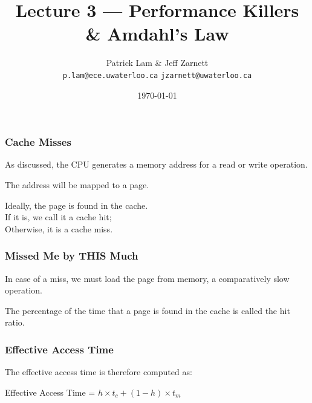 

\title{Lecture 3 --- Performance Killers \& Amdahl's Law }

\author{Patrick Lam \& Jeff Zarnett \\ \small \texttt{p.lam@ece.uwaterloo.ca} \texttt{jzarnett@uwaterloo.ca}}
\date{\today}




\begin{frame}
  \titlepage

 \end{frame}



\begin{frame}
\frametitle{Cache Misses}

As discussed, the CPU generates a memory address for a read or write operation.

The address will be mapped to a page. 

Ideally, the page is found in the cache.\\
\quad If it is, we call it a \alert{cache hit};\\
\quad Otherwise, it is a \alert{cache miss}.

\end{frame}



\begin{frame}
\frametitle{Missed Me by THIS Much}

In case of a miss, we must load the page from memory, a comparatively slow operation.


The percentage of the time that a page is found in the cache is called the \alert{hit ratio}.

\end{frame}



\begin{frame}
\frametitle{Effective Access Time}

 The effective access time is therefore computed as:

\begin{center}
Effective Access Time = $h \times t_{c} + (1-h) \times t_{m}$
\end{center}

\end{frame}



